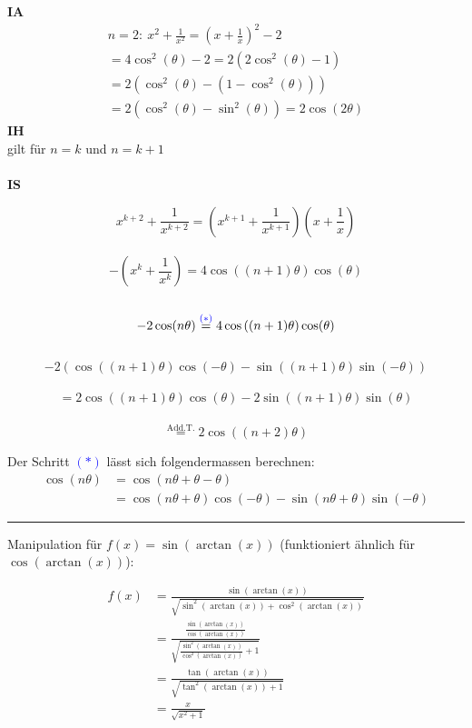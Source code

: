 \documentclass[a4paper,fontsize = 7pt]{scrartcl}
\begin{document}
	\textbf{IA}%
	\begin{align*}
		n=2:~x^2 + \frac{1}{x^2} = \left( x + \frac{1}{x} \right)^2 -2 \\= 4 \cos^2 (\theta) -2
					 = 2 \left( 2 \cos^2 (\theta) -1 \right) \\
           = 2 \left( \cos^2 (\theta) - \left( 1 - \cos^2 (\theta) \right) \right)\\
					 = 2 \left( \cos^2 (\theta) - \sin^2 (\theta) \right) = 2 \cos (2 \theta)
	\end{align*}
	\textbf{IH}%
	\\gilt für $n=k$ und $n=k+1$\\
   \\
	\textbf{IS}%
	
		$$x^{k+2} + \frac{1}{x^{k+2}} = \left( x^{k+1} + \frac{1}{x^{k+1}} \right)\left( x + \frac{1}{x} \right)$$ 
    \\$$- \left( x^{k} + \frac{1}{x^{k}} \right) = 4 \cos \left( (n+1) \theta \right) \cos(\theta)$$ 
     \\$$- 2 \cos (n \theta) \overset{\text{\textcolor{blue}{$(*)$}}}= 4 \cos \left( (n+1) \theta \right) \cos(\theta)$$ 
     \\$$- 2 \left( \cos \left( (n+1) \theta \right) \cos(-\theta) 
    - \sin \left( (n+1) \theta \right) \sin(-\theta) \right)$$\\
		$$= 2 \cos \left( (n+1) \theta \right) \cos(\theta) - 2 \sin \left( (n+1) \theta \right) \sin (\theta)$$
    \\$$\overset{\text{Add.T.}}{=} 2 \cos \left( (n+2) \theta \right)$$
	
	Der Schritt \textcolor{blue}{$(*)$} lässt sich folgendermassen berechnen:
	\begin{align*}
		\cos(n \theta) 
    &= \cos (n\theta + \theta -\theta)\\ 
    &= \cos(n \theta + \theta) \cos(-\theta) - \sin(n \theta + \theta ) \sin ( -\theta)
	\end{align*}

\vspace{0.1 cm}
\hrule
\vspace{0.2 cm}

Manipulation für $f(x) = \sin(\arctan (x))$ (funktioniert ähnlich für $\cos(\arctan (x))$):

\begin{align*}
  f(x) &=\frac{\sin(\arctan(x))}{\sqrt{\sin^2(\arctan(x))+\cos^2(\arctan(x))}}\\
  &=\frac{\frac{\sin(\arctan(x))}{\cos(\arctan(x))}}{\sqrt{\frac{\sin^2(\arctan(x))}{\cos^2(\arctan(x))}+1}}\\
  &=\frac{\tan(\arctan(x))}{\sqrt{\tan^2(\arctan(x))+1}}\\
  &=\frac{x}{\sqrt{x^2+1}}
\end{align*}
\end{document}
